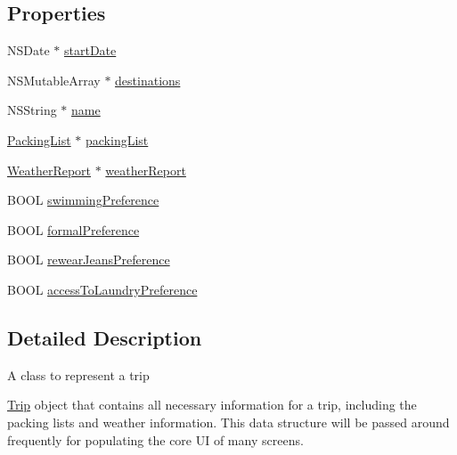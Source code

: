 \subsection*{Properties}
\begin{DoxyCompactItemize}
\item 
N\-S\-Date $\ast$ \hyperlink{interface_trip_aa73721dd452a5a0c94841aa155761d67}{start\-Date}
\item 
N\-S\-Mutable\-Array $\ast$ \hyperlink{interface_trip_a396ca8de2ed1b20c1255cbb5e9b524ed}{destinations}
\item 
N\-S\-String $\ast$ \hyperlink{interface_trip_a66e63287102687fe25366d61889fe8e1}{name}
\item 
\hyperlink{interface_packing_list}{Packing\-List} $\ast$ \hyperlink{interface_trip_a985205885a33d59e7e8b899cab47f2d0}{packing\-List}
\item 
\hyperlink{interface_weather_report}{Weather\-Report} $\ast$ \hyperlink{interface_trip_a50df03c3a57389928c170792a63aa67f}{weather\-Report}
\item 
B\-O\-O\-L \hyperlink{interface_trip_a3f7f9fac616d0861b0229a31aa485f39}{swimming\-Preference}
\item 
B\-O\-O\-L \hyperlink{interface_trip_a4ea48dfbac9dff7d387617f1113c3d08}{formal\-Preference}
\item 
B\-O\-O\-L \hyperlink{interface_trip_a0a0bd7f81cb9866501819178b9167fad}{rewear\-Jeans\-Preference}
\item 
B\-O\-O\-L \hyperlink{interface_trip_a5807a192e5170272e808780c5e74ca5a}{access\-To\-Laundry\-Preference}
\end{DoxyCompactItemize}


\subsection{Detailed Description}
A class to represent a trip

\hyperlink{interface_trip}{Trip} object that contains all necessary information for a trip, including the packing lists and weather information. This data structure will be passed around frequently for populating the core U\-I of many screens. 

